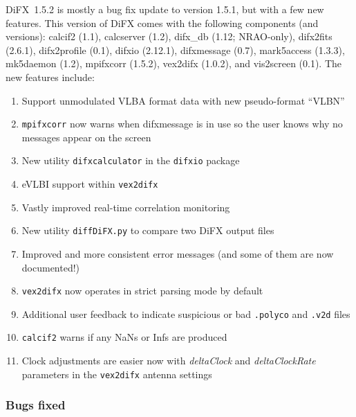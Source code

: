DiFX~1.5.2 is mostly a bug fix update to version 1.5.1, but with a few new features.
This version of DiFX comes with the following components (and versions): calcif2 (1.1), calcserver (1.2), difx\_db (1.12; NRAO-only), difx2fits (2.6.1), difx2profile (0.1), difxio (2.12.1), difxmessage (0.7), mark5access (1.3.3), mk5daemon (1.2), mpifxcorr (1.5.2), vex2difx (1.0.2), and vis2screen (0.1).
The new features include:
\begin{enumerate}
\item Support unmodulated VLBA format data with new pseudo-format ``VLBN''
\item {\tt mpifxcorr} now warns when difxmessage is in use so the user knows why no messages appear on the screen
\item New utility {\tt difxcalculator} in the {\tt difxio} package
\item eVLBI support within {\tt vex2difx}
\item Vastly improved real-time correlation monitoring
\item New utility {\tt diffDiFX.py} to compare two DiFX output files
\item Improved and more consistent error messages (and some of them are now documented!)
\item {\tt vex2difx} now operates in strict parsing mode by default
\item Additional user feedback to indicate suspicious or bad {\tt .polyco} and {\tt .v2d} files
\item {\tt calcif2} warns if any NaNs or Infs are produced
\item Clock adjustments are easier now with {\em deltaClock} and {\em deltaClockRate} parameters in the {\tt vex2difx} antenna settings
\end{enumerate}

\subsubsection{Bugs fixed}

